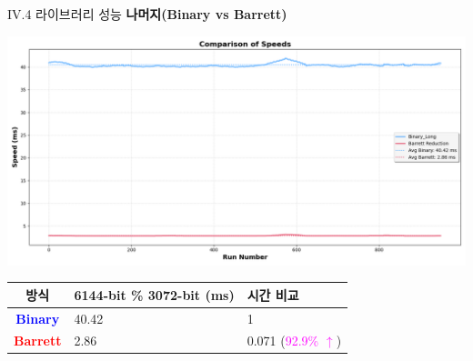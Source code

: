 \documentclass{beamer}
\begin{document}
\begin{frame}{IV.4 라이브러리 성능}
	\alert{\bf 나머지(Binary vs Barrett)}\\
	\begin{center}
		\includegraphics[width=\linewidth,height=.525\textheight]{red_3072.png}
	\end{center}
	\begin{center}
		\begin{tabularx}{\textwidth}{c||XX}
			\hline
			방식 & 6144-bit \% 3072-bit (ms) & 시간 비교\\
			\midrule
			\textcolor{blue}{\bf Binary} & 40.42 & 1 \\
			\textcolor{red}{\bf Barrett} & 2.86 & 0.071 (\textcolor{magenta}{92.9\% $\uparrow$})\\
			\hline
		\end{tabularx}
	\end{center}
\end{frame}
\end{document}
